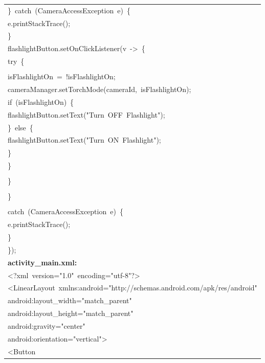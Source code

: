 \documentclass[a4paper,12pt]{article}
\begin{document}
\begin{longtable}{|p{}|}
{\ttfamily\small \}\ catch\ (CameraAccessException\ e)\ \{} \\
{\ttfamily\small e.printStackTrace();} \\
{\ttfamily\small \}} \\
{\ttfamily\small flashlightButton.setOnClickListener(v\ -\textgreater{}\ \{} \\
{\ttfamily\small try\ \{} \\
\strut \\
{\ttfamily\small isFlashlightOn\ =\ !isFlashlightOn;} \\
{\ttfamily\small cameraManager.setTorchMode(cameraId,\ isFlashlightOn);} \\
{\ttfamily\small if\ (isFlashlightOn)\ \{} \\
{\ttfamily\small flashlightButton.setText("Turn\ OFF\ Flashlight");} \\
{\ttfamily\small \}\ else\ \{} \\
{\ttfamily\small flashlightButton.setText("Turn\ ON\ Flashlight");} \\
{\ttfamily\small \}} \\
{\ttfamily\small \}} \\
\strut \\
{\ttfamily\small \}} \\
\strut \\
{\ttfamily\small \}} \\
\strut \\
{\ttfamily\small catch\ (CameraAccessException\ e)\ \{} \\
{\ttfamily\small e.printStackTrace();} \\
{\ttfamily\small \}} \\
{\ttfamily\small \});} \\
\hline
\rule{0pt}{13pt}\textbf{activity\_main.xml:} \\
\hline
{\ttfamily\small \textless{}?xml\ version="1.0"\ encoding="utf-8"?\textgreater{}} \\
{\ttfamily\small \textless{}LinearLayout\ xmlns:android="http://schemas.android.com/apk/res/android"} \\
{\ttfamily\small android:layout\_width="match\_parent"} \\
{\ttfamily\small android:layout\_height="match\_parent"} \\
{\ttfamily\small android:gravity="center"} \\
{\ttfamily\small android:orientation="vertical"\textgreater{}} \\
{\ttfamily\small \textless{}Button} \\

\end{longtable}
\end{document}
